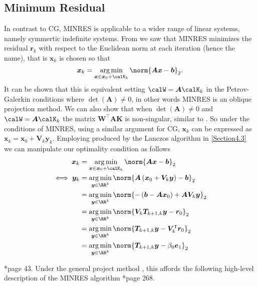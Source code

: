 \subsection{Minimum Residual}\label{Section4.6}
In contrast to CG, MINRES is applicable to a wider range of linear systems, namely symmertic indefinite systems. From  we saw that MINRES minimizes the residual $\bm{r}_k$ with respect to the Euclidean norm at each iteration (hence the name), that is $\bm{x}_k$ is chosen so that
\begin{equation} \label{eq: minres_opt_cond_1}
    \bm{x}_k = \argmin_{\bm{x} \in \bm{x}_0 + \calK_k} \norm{\bm{A} \bm {x} - \bm{b}}_2.
\end{equation}
It can be shown that this is equivalent setting $\calW = \bm{A} \calK_k$ in the Petrov-Galerkin conditions where $\det \left( \bm{A} \right) \neq 0$, in other words MINRES is an oblique projection method. We can also show that when $\det \left( \bm{A} \right) \neq 0$ and $\calW = \bm{A} \calK_k$ the matrix $\bm{W}^{\intercal} \bm{A} \bm{K}$ is non-singular, similar to . So under the conditions of MINRES, using a similar argument for CG, $\bm{x}_k$ can be expressed as $\bm{x}_k = \bm{x}_0 + \bm{V}_k \bm{y}_k$. Employing  produced by the Lanczos algorithm in \ref{Section4.3} we can manipulate our optimality condition  as follows
\begin{align*}
    \bm{x}_k      & = \argmin_{\bm{x} \in \bm{x}_0 + \calK_k} \norm{\bm{A} \bm {x} - \bm{b}}_2                                 \\
    \iff \bm{y}_k & = \argmin_{\bm{y} \in \RR^k} \norm{\bm{A} \left( \bm{x}_0 + \bm{V}_k \bm{y} \right) - \bm{b}}_2            \\
                  & = \argmin_{\bm{y} \in \RR^k} \norm{ - \left( \bm{b} - \bm{A} \bm{x}_0 \right) + \bm{A} \bm{V}_k \bm{y} }_2 \\
                  & = \argmin_{\bm{y} \in \RR^k} \norm{ \bm{V}_{k} \bm{T}_{k+1,k} \bm{y} - \bm{r}_0 }_2                        \\
                  & = \argmin_{\bm{y} \in \RR^k} \norm{ \bm{T}_{k+1,k} \bm{y} - \bm{V}_{k}^{\intercal} \bm{r}_0 }_2            \\
                  & = \argmin_{\bm{y} \in \RR^k} \norm{ \bm{T}_{k+1,k} \bm{y} - \beta_0 \bm{e}_1 }_2
\end{align*}

\cite{GreenbaumAnne1997Imfs}*{page 43}. Under the general project method , this affords the following high-level description of the MINRES algorithm \cite{TrefethenLloydN.LloydNicholas1997Nla/}*{page 268}.

